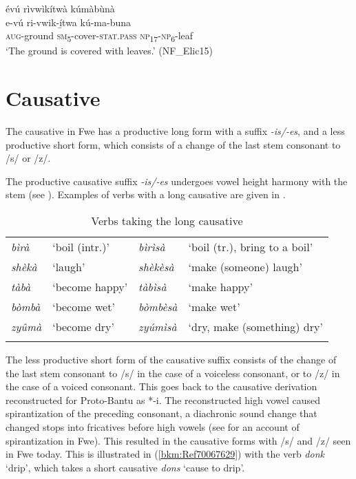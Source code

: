 \ea
\label{bkm:Ref451331093}
évú rìvwìkítwà kúmàbùnà\\
\gll e-vú    ri-vwik-í̲twa      kú-ma-buna\\
\textsc{aug}-ground  \textsc{sm}\textsubscript{5}-cover-\textsc{stat}.\textsc{pass}  \textsc{np}\textsubscript{17}-\textsc{np}\textsubscript{6}-leaf\\
\glt ‘The ground is covered with leaves.’ (NF\_Elic15)
\z
\section{Causative}
\label{bkm:Ref451514620}\hypertarget{Toc75352659}{}
The causative in Fwe has a productive long form with a suffix \textit{-is/-es}, and a less productive short form, which consists of a change of the last stem consonant to /s/ or /z/.

The productive causative suffix \textit{-is/-es} undergoes vowel height harmony with the stem (see ). Examples of verbs with a long causative are given in .

\begin{table}
\label{bkm:Ref463339933}\caption{\label{tab:6:1}Verbs taking the long causative}
\begin{tabularx}{\textwidth}{XlXl}
\lsptoprule
\textit{bìrà} & ‘boil (intr.)’ & \textit{bìrìsà} & ‘boil (tr.), bring to a boil’\\
\textit{shèkà} & ‘laugh’ & \textit{shèkèsà} & ‘make (someone) laugh’\\
\textit{tàbà} & ‘become happy’ & \textit{tàbìsà} & ‘make happy’\\
\textit{bòmbà} & ‘become wet’ & \textit{bòmbèsà} & ‘make wet’\\
\textit{zyûmà} & ‘become dry’ & \textit{zyúmìsà} & ‘dry, make (something) dry’\\
\lspbottomrule
\end{tabularx}
\end{table}

The less productive short form of the causative suffix consists of the change of the last stem consonant to /s/ in the case of a voiceless consonant, or to /z/ in the case of a voiced consonant. This goes back to the causative derivation reconstructed for Proto-Bantu as *-i. The reconstructed high vowel caused spirantization of the preceding consonant, a diachronic sound change that changed stops into fricatives before high vowels (see \citealt{Bostoen2009} for an account of spirantization in Fwe). This resulted in the causative forms with /s/ and /z/ seen in Fwe today. This is illustrated in (\ref{bkm:Ref70067629}) with the verb \textit{donk} ‘drip’, which takes a short causative \textit{dons} ‘cause to drip’.

